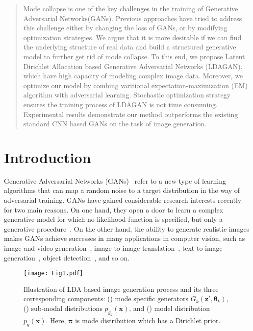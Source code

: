 \documentclass{article}
\begin{document}
\begin{abstract}
Mode collapse is one of the key challenges in the training of Generative Adversarial Networks(GANs).
Previous approaches have tried to address this challenge either by changing the loss of GANs, or by modifying optimization strategies.
We argue that it is more desirable if we can find the underlying structure of real data and build a structured generative model to further get rid of mode collapse.
To this end, we propose Latent Dirichlet Allocation based Generative Adversarial Networks (LDAGAN), which have high capacity of modeling complex image data.
Moreover, we optimize our model by combing varitional expectation-maximization (EM) algorithm with adversarial learning.
Stochastic optimization strategy ensures the training process of LDAGAN is not time consuming.
Experimental results demonstrate our method outperforms the existing standard CNN based GANs on the task of image generation.
\end{abstract}

\section{Introduction}
\label{sec:Intro}

Generative Adversarial Networks (GANs)~\cite{goodfellow2014generative} refer to a new type of learning algorithms that can map a random noise to a target distribution in the way of adversarial training.
GANs have gained considerable research interests recently for two main reasons.
On one hand, they open a door to learn a complex generative model for which no likelihood function is specified, but only a generative procedure~\cite{uehara2016generative,mohamed2017learning,nowozin2016f,tran2017deep}.
On the other hand, the ability to generate realistic images makes GANs achieve successes in many applications in computer vision, such as image and video generation~\cite{tran2017disentangled,bansal2018recycle,yang2017learning}, image-to-image translation~\cite{zhu2017unpaired,yi2017dualgan,liu2017unsupervised}, text-to-image generation~\cite{reed2016generative,zhang2017stackgan},  object detection~\cite{li2017perceptual}, and so on.

\begin{figure}[t]
  \centering
    \texttt{[image: Fig1.pdf]}
     \caption{Illustration of LDA based image generation process and its three corresponding components: () mode specific generators $G_k\left(\mathbf{z}',\bm{\theta}_k\right)$, () sub-modal distributions $p_{g_k}\left(\mathbf{x}\right)$, and () model distribution $p_g\left(\mathbf{x}\right)$. Here, $\bm{\pi}$ is mode distribution which has a Dirichlet prior.}
     \label{fig:1}
\end{figure}
\end{document}
